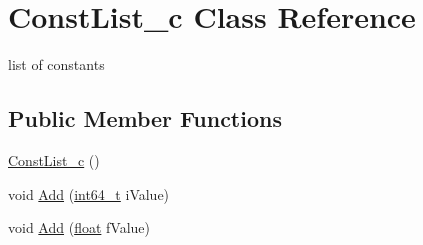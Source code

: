 \hypertarget{classConstList__c}{\section{Const\-List\-\_\-c Class Reference}
\label{classConstList__c}
}


list of constants  


\subsection*{Public Member Functions}
\begin{DoxyCompactItemize}
\item 
\hyperlink{classConstList__c_a9d30847a838e8a38956fb8b3da005ff9}{Const\-List\-\_\-c} ()
\item 
void \hyperlink{classConstList__c_a699f19b21fd8bf705802ba36c261fba5}{Add} (\hyperlink{sphinxstd_8h_a996e72f71b11a5bb8b3b7b6936b1516d}{int64\-\_\-t} i\-Value)
\item 
void \hyperlink{classConstList__c_a9f16abe97269b94fc4a7a8d6886f7e15}{Add} (\hyperlink{sphinxexpr_8cpp_a0e0d0739f7035f18f949c2db2c6759ec}{float} f\-Value)
\end{DoxyCompactItemize}

